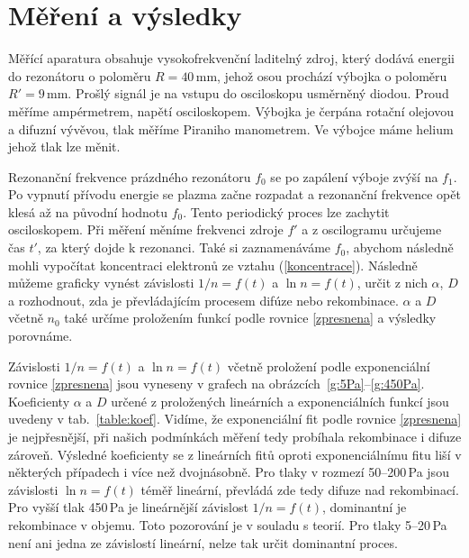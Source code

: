 \documentclass[a4paper,12pt]{article}
\begin{document}
\section{Měření a výsledky}
Měřící aparatura obsahuje vysokofrekvenční laditelný zdroj, který dodává energii do rezonátoru o poloměru $R = 40\,\si{\milli\meter}$, jehož osou prochází výbojka o poloměru $R' = 9\,\si{\milli\meter}$. Prošlý signál je na vstupu do osciloskopu usměrněný diodou. Proud měříme ampérmetrem, napětí osciloskopem. Výbojka je čerpána rotační olejovou a difuzní vývěvou, tlak měříme Piraniho manometrem. Ve výbojce máme helium jehož tlak lze měnit.

Rezonanční frekvence prázdného rezonátoru $f_0$ se po zapálení výboje zvýší na 
$f_1$. Po vypnutí přívodu energie se plazma začne rozpadat a rezonanční 
frekvence opět klesá až na původní hodnotu $f_0$. Tento periodický proces lze 
zachytit osciloskopem. Při měření měníme frekvenci zdroje $f'$ a z oscilogramu 
určujeme čas $t'$, za který dojde k rezonanci. Také si zaznamenáváme $f_0$, 
abychom následně mohli vypočítat koncentraci elektronů ze vztahu (\ref{koncentrace}). 
Následně můžeme graficky vynést závislosti $1/n = f(t)$ a $\ln n = f(t)$, 
určit z nich $\alpha$, $D$ a rozhodnout, zda je převládajícím procesem difúze 
nebo rekombinace. $\alpha$ a $D$ včetně $n_0$ také určíme proložením funkcí 
podle rovnice \eqref{zpresnena} a výsledky porovnáme.

Závislosti $1/n = f(t)$ a $\ln n = f(t)$ včetně proložení podle exponenciální 
rovnice 
\eqref{zpresnena} jsou vyneseny v grafech na obrázcích~\ref{g:5Pa}--\ref{g:450Pa}. 
Koeficienty $\alpha$ a $D$ určené z proložených lineárních a exponenciálních funkcí jsou 
uvedeny v tab.~\ref{table:koef}. Vidíme, že exponenciální fit podle rovnice 
\ref{zpresnena} je nejpřesnější, při našich podmínkách měření tedy probíhala 
rekombinace i difuze zároveň. Výsledné koeficienty se z lineárních fitů oproti 
exponenciálnímu fitu liší v některých případech i více než dvojnásobně. Pro 
tlaky v rozmezí 50--200\,Pa jsou závislosti $\ln n = f(t)$ téměř lineární, 
převládá zde tedy difuze nad rekombinací. Pro vyšší tlak 450\,Pa je lineárnější 
závislost $1/n = f(t)$, dominantní je rekombinace v objemu. Toto pozorování je 
v souladu s teorií. Pro tlaky 5--20\,Pa není ani jedna ze závislostí lineární, 
nelze tak určit dominantní proces. 
\end{document}
